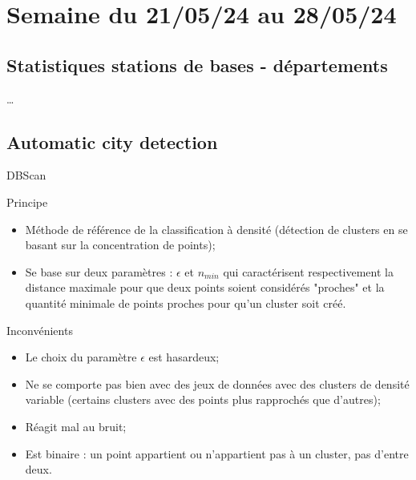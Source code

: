 \smallframetitle

\section{Semaine du 21/05/24 au 28/05/24}
\insertsectionframe

\subsection{Statistiques stations de bases - départements}
\insertsubsectionframe

\begin{frame}{\dots}
       
\end{frame}


\subsection{Automatic city detection}
\insertsubsectionframe

\begin{frame}{DBScan}
    \begin{block}{Principe}
        \begin{itemize}
            \item Méthode de référence de la classification à densité (détection de clusters en se basant sur la concentration de points);
            \item Se base sur deux paramètres : $\epsilon$ et $n_{min}$ qui caractérisent respectivement la distance maximale pour que deux points soient considérés "proches" et la quantité minimale de points proches pour qu'un cluster soit créé.
        \end{itemize}
    \end{block}

    \begin{block}{Inconvénients}
        \begin{itemize}
            \item Le choix du paramètre $\epsilon$ est hasardeux;
            \item Ne se comporte pas bien avec des jeux de données avec des clusters de densité variable (certains clusters avec des points plus rapprochés que d'autres);
            \item Réagit mal au bruit;
            \item Est binaire : un point appartient ou n'appartient pas à un cluster, pas d'entre deux.
        \end{itemize}
    \end{block}
\end{frame}


